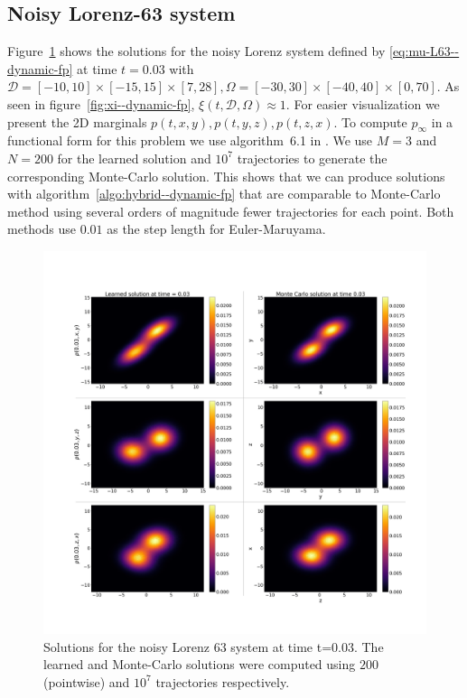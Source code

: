 \subsection{Noisy Lorenz-63 system}\label{ssec-res-L63--dynamic-fp}
Figure~\ref{fig:L63-time--dynamic-fp} shows the solutions for the noisy Lorenz system defined by \eqref{eq:mu-L63--dynamic-fp} at time $t=0.03$ with $\mathcal D=[-10, 10]\times[-15, 15]\times[7, 28], \Omega=[-30, 30]\times[-40, 40]\times[0, 70]$. As seen in figure~\ref{fig:xi--dynamic-fp}, $\xi(t,  \mathcal D, \Omega)\approx 1$. For easier visualization we present the 2D marginals $p(t, x, y), p(t, y, z), p(t, z, x)$. To compute $p_\infty$ in a functional form for this problem we use algorithm~6.1 in \cite{mandal2023learning}. We use $M=3$ and $N=200$ for the learned solution and $10^7$ trajectories to generate the corresponding Monte-Carlo solution. This shows that we can produce solutions with algorithm~\ref{algo:hybrid--dynamic-fp} that are comparable to Monte-Carlo method using 
several orders of magnitude fewer trajectories for each point. Both methods use $0.01$ as the step length for Euler-Maruyama.
 \begin{figure}[!ht]
    \centering
\includegraphics[scale=0.21]{dynamic-fp/plots/dynamic-plots-L63-time.png}
    \caption{Solutions for the noisy Lorenz 63 system at time t=0.03. The learned and Monte-Carlo solutions were computed using $200$ (pointwise) and $10^7$ trajectories respectively.}
    \label{fig:L63-time--dynamic-fp}
\end{figure}

